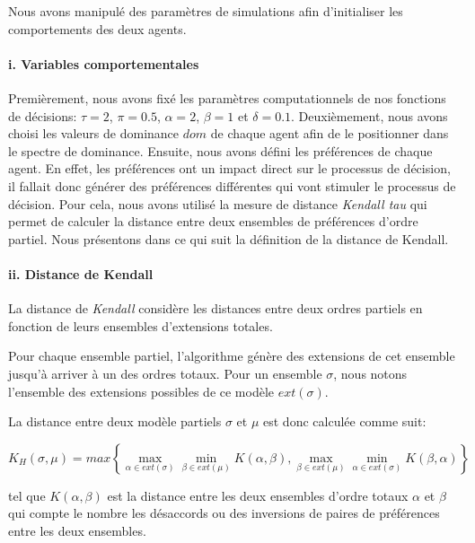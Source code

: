 				
				Nous avons manipulé des paramètres de simulations afin d'initialiser les comportements des deux agents.
				
				\paragraph{i. Variables comportementales}
				
				Premièrement, nous avons fixé les paramètres computationnels de nos fonctions de décisions: $\tau=2$, $\pi=0.5$, $\alpha=2$, $\beta=1$ et $\delta=0.1$. 
				Deuxièmement, nous avons choisi les valeurs de dominance $dom$ de chaque agent afin de le positionner dans le spectre de dominance. 
				Ensuite, nous avons défini les préférences de chaque agent. En effet, les préférences ont un impact direct sur le processus de décision, il fallait donc générer des préférences différentes qui vont stimuler le processus de décision. Pour cela, nous avons utilisé la mesure de distance \emph{Kendall tau} \cite{bra2013Kendall} qui permet de calculer la distance entre deux ensembles de préférences d'ordre partiel. 
				Nous présentons dans ce qui suit la définition de la distance de Kendall. 
				
				\vspace{1 em}
				\paragraph{ii. Distance de Kendall}
				La distance de \emph{Kendall} considère les distances entre deux ordres partiels en fonction de leurs ensembles d'extensions totales.
				
				Pour chaque ensemble partiel, l'algorithme génère des extensions de cet ensemble jusqu'à arriver à un des ordres totaux. Pour un ensemble $\sigma$, nous notons l'ensemble des extensions possibles de ce modèle $ext(\sigma)$.
				
				La distance entre deux modèle partiels  $\sigma$ et $\mu$ est donc calculée comme suit: 

				
				\begin{equation*}
					K_H(\sigma,\mu) = max \left \{ \max\limits_{\alpha \in ext(\sigma)} \min\limits_{\beta \in ext(\mu)} K(\alpha , \beta), \max\limits_{\beta \in ext(\mu)} \min\limits_{\alpha \in ext(\sigma)} K(\beta, \alpha)  \right \}
				\end{equation*}
				
				tel que $K(\alpha , \beta)$ est la distance entre les deux ensembles d'ordre totaux $\alpha$ et $\beta$ qui compte le nombre les désaccords ou des inversions de paires de préférences entre les deux ensembles. 
				 

